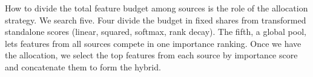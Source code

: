 
How to divide the total feature budget among sources is the role of the allocation strategy. We search five. Four divide the budget in fixed shares from transformed standalone scores (linear, squared, softmax, rank decay). The fifth, a global pool, lets features from all sources compete in one importance ranking. Once we have the allocation, we select the top features from each source by importance score and concatenate them to form the hybrid.



